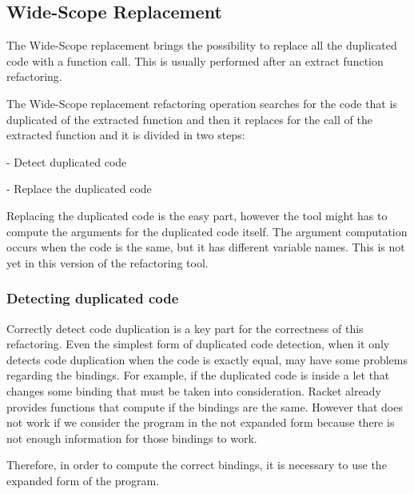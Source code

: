 
\subsection{Wide-Scope Replacement} %
The Wide-Scope replacement brings the possibility to replace all the duplicated
code with a function call. This is usually performed after an extract function refactoring.

The Wide-Scope replacement refactoring operation searches for the code that is duplicated of the extracted function and then it replaces for the call of the
extracted function and it is divided in two steps: %

- Detect duplicated code

- Replace the duplicated code

Replacing the duplicated code is the easy part, however the tool might has to compute %
the arguments for the duplicated code itself. The argument computation occurs when
the code is the same, but it has different variable names. This is not yet in this
version of the refactoring tool. %

\subsubsection{Detecting duplicated code}
Correctly detect code duplication is a key part for the correctness of this refactoring.
Even the simplest form of duplicated code detection, when it only detects code duplication
when the code is exactly equal, may have some problems regarding the bindings.
For example, if the duplicated code is inside a let that changes some binding that must
be taken into consideration.
Racket already provides functions that compute if the bindings are the same.
However that does not work if we consider the program in the not expanded
form because there is not enough information for those bindings to work. %


Therefore, in order to compute the correct bindings, it is necessary to use the expanded form
of the program.

